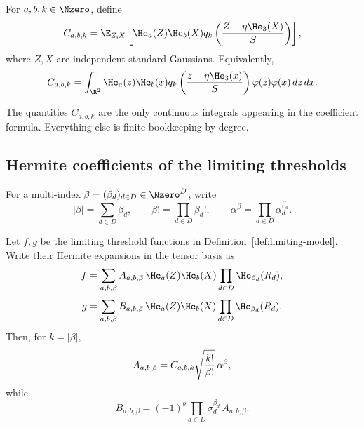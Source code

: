\begin{definition}\label{def:Cabk}
For $a,b,k\in\Nzero$, define
\begin{equation}\label{eq:C-abk}
  C_{a,b,k}
  =\E_{Z,X}\left[\He_a(Z)\He_b(X)
    q_k\left({Z+\eta \He_3(X)\over S}\right)\right],
\end{equation}
where $Z,X$ are independent standard Gaussians.  Equivalently,
\[
  C_{a,b,k}=\int_{\R^2}\He_a(z)\He_b(x)
  q_k\left({z+\eta \He_3(x)\over S}\right)\varphi(z)\varphi(x)\,dz\,dx.
\]
\end{definition}

The quantities $C_{a,b,k}$ are the only continuous integrals appearing in the coefficient formula.  Everything else is finite bookkeeping by degree.

\subsection{Hermite coefficients of the limiting thresholds}\label{subsec:threshold-hermite-coefficients}

For a multi-index $\beta=(\beta_d)_{d\in D}\in\Nzero^D$, write
\[
  |\beta|=\sum_{d\in D}\beta_d,
  \qquad
  \beta!=\prod_{d\in D}\beta_d!,
  \qquad
  \alpha^\beta=\prod_{d\in D}\alpha_d^{\beta_d}.
\]

\begin{proposition}\label{prop:hermite-coefficients}
Let $f,g$ be the limiting threshold functions in Definition~\ref{def:limiting-model}.  Write their Hermite expansions in the tensor basis as
\[
  f=\sum_{a,b,\beta} A_{a,b,\beta}\,\He_a(Z)\He_b(X)\prod_{d\in D}\He_{\beta_d}(R_d),
\]
\[
  g=\sum_{a,b,\beta} B_{a,b,\beta}\,\He_a(Z)\He_b(X)\prod_{d\in D}\He_{\beta_d}(R_d).
\]
Then, for $k=|\beta|$,
\begin{equation}\label{eq:f-coeff}
  A_{a,b,\beta}=C_{a,b,k}\sqrt{k!\over \beta!}\,\alpha^\beta,
\end{equation}
while
\begin{equation}\label{eq:g-coeff}
  B_{a,b,\beta}=(-1)^b\prod_{d\in D}\sigma_d^{\beta_d}\,A_{a,b,\beta}.
\end{equation}
\end{proposition}

